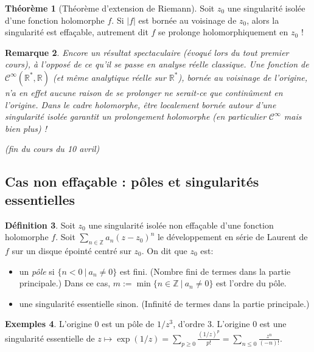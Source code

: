 \documentclass[11pt,a4paper]{book}
\newcommand{\Z}{\mathbb{Z}}
\newcommand{\R}{\mathbb{R}}
\theoremstyle{definition}
\newtheorem{theoreme}{Th\'eor\`eme}[section]
\newtheorem{definition}[theoreme]{D\'efinition}
\newtheorem{exemples}[theoreme]{Exemples}
\theoremstyle{plain}
\newtheorem{remarque}[theoreme]{Remarque}
\begin{document}
\begin{theoreme}[Théorème d'extension de Riemann]
Soit $z_0$ une singularité isolée d'une fonction holomorphe $f$.
Si $|f|$ est bornée au voisinage de $z_0$, alors la singularité est effaçable, autrement dit $f$ se prolonge holomorphiquement en $z_0$ !
\end{theoreme}

\begin{remarque}
Encore un résultat spectaculaire (évoqué lors du tout premier cours), à l'opposé de ce qu'il se passe  en analyse réelle classique.
Une fonction de $\mathcal C^\infty(\R^*,\R)$ (et même analytique réelle sur $\R^*$), bornée au voisinage de l'origine, n'a en effet aucune raison de se prolonger ne serait-ce que continûment en l'origine. 
Dans le cadre holomorphe, être localement bornée autour d'une singularité isolée garantit un prolongement holomorphe (en particulier $\mathcal C^\infty$ mais bien plus) !
\end{remarque}


\begin{center}
\emph{(fin du cours du 10 avril)}
\end{center}

\subsection{Cas non effaçable : pôles et singularités essentielles}

\begin{definition}
Soit $z_0$ une singularité isolée non effaçable d'une fonction holomorphe $f$.
Soit $\sum_{n\in \Z}a_n(z-z_0)^n$ le développement en série de Laurent de $f$ sur un disque épointé centré sur $z_0$.
On dit que $z_0$ est:
\begin{itemize}
\item un \emph{pôle} si $\{n<0\:|\: a_n\neq 0\}$ est fini. (Nombre fini de termes dans la partie principale.) Dans ce cas, $m:=\min\{n\in \Z\:|\: a_n\neq 0\}$ est l'ordre du pôle.
\item une singularité essentielle sinon. (Infinité de termes dans la partie principale.)
\end{itemize}
\end{definition}

\begin{exemples}
L'origine $0$ est un pôle de $1/z^3$, d'ordre $3$. 
L'origine $0$ est une singularité essentielle de $z\mapsto \exp(1/z)=\sum_{p\geq 0}\frac{(1/z)^p}{p!} = \sum_{n\leq 0} \frac{z^n}{(-n)!}$.
\end{exemples}
\end{document}
